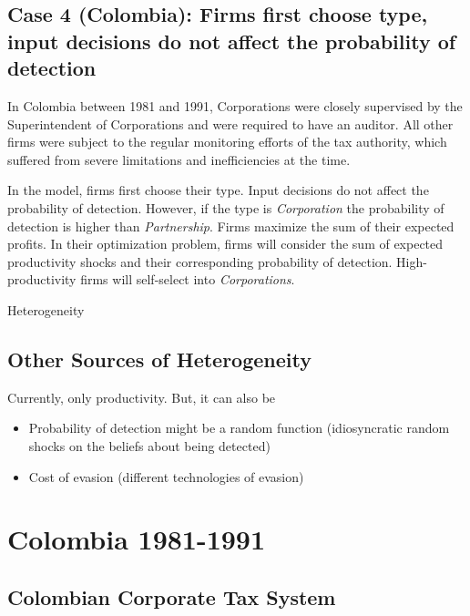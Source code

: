 \documentclass[
  12pt]{article}
\providecommand{\tightlist}{%
  \setlength{\itemsep}{0pt}\setlength{\parskip}{0pt}}\usepackage{longtable,booktabs,array}
\theoremstyle{definition}
\theoremstyle{remark}
\begin{document}
\subsection{Case 4 (Colombia): Firms first choose type, input decisions
do not affect the probability of
detection}\label{case-4-colombia-firms-first-choose-type-input-decisions-do-not-affect-the-probability-of-detection}

In Colombia between 1981 and 1991, Corporations were closely supervised
by the Superintendent of Corporations and were required to have an
auditor. All other firms were subject to the regular monitoring efforts
of the tax authority, which suffered from severe limitations and
inefficiencies at the time.

In the model, firms first choose their type. Input decisions do not
affect the probability of detection. However, if the type is
\emph{Corporation} the probability of detection is higher than
\emph{Partnership}. Firms maximize the sum of their expected profits. In
their optimization problem, firms will consider the sum of expected
productivity shocks and their corresponding probability of detection.
High-productivity firms will self-select into \emph{Corporations}.

\begin{anfxnote}{Heterogeneity}

\subsection{Other Sources of
Heterogeneity}\label{other-sources-of-heterogeneity}

Currently, only productivity. But, it can also be

\begin{itemize}
\tightlist
\item
  Probability of detection might be a random function (idiosyncratic
  random shocks on the beliefs about being detected)
\item
  Cost of evasion (different technologies of evasion)
\end{itemize}

\end{anfxnote}

\section{Colombia 1981-1991}\label{colombia-1981-1991}

\subsection{Colombian Corporate Tax
System}\label{colombian-corporate-tax-system}
\end{document}
